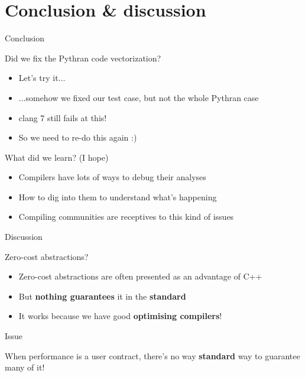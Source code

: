 \section{Conclusion \& discussion}

\begin{frame}{Conclusion}
  \begin{block}{Did we fix the Pythran code vectorization?}
    \begin{itemize}
      \item Let's try it...
      \pause
      \item ...somehow we fixed our test case, but not the whole Pythran case
      \item clang 7 still fails at this!
      \item So we need to re-do this again :)
    \end{itemize}
  \end{block}

  \pause

  \begin{alertblock}{What did we learn? (I hope)}
    \begin{itemize}
      \item Compilers have lots of ways to debug their analyses
      \item How to dig into them to understand what's happening
      \item Compiling communities are receptives to this kind of issues
    \end{itemize}
  \end{alertblock}
\end{frame}

\begin{frame}{Discussion}
  \begin{block}{Zero-cost abstractions?}
    \begin{itemize}
      \item Zero-cost abstractions are often presented as an advantage of C++
      \item But {\bf nothing guarantees} it in the {\bf standard} 
      \item It works because we have good {\bf optimising compilers}!
    \end{itemize}
  \end{block}

  \pause

  \begin{alertblock}{Issue}
    \begin{center}
      When performance is a user contract, there's no way {\bf standard} way to
      guarantee many of it!
    \end{center}
  \end{alertblock}
\end{frame}

